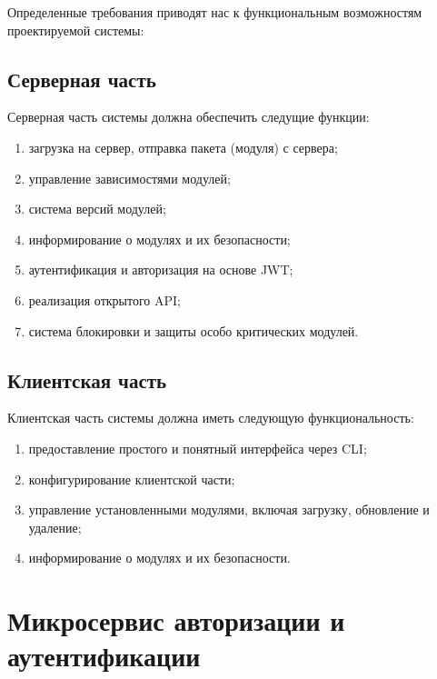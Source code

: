 Определенные требования приводят нас к функциональным возможностям проектируемой системы:

\subsection{Серверная часть}

Серверная часть системы должна обеспечить следущие функции:

\begin{enumerate}
    \item загрузка на сервер, отправка пакета (модуля) с сервера;
    \item управление зависимостями модулей;
    \item система версий модулей;
    \item информирование о модулях и их безопасности;
    \item аутентификация и авторизация на основе JWT;
    \item реализация открытого API;
    \item система блокировки и защиты особо критических модулей.
\end{enumerate}


\subsection{Клиентская часть}

Клиентская часть системы должна иметь следующую функциональность:

\begin{enumerate}
    \item предоставление простого и понятный интерфейса через CLI;
    \item конфигурирование клиентской части;
    \item управление установленными модулями, включая загрузку, обновление и удаление;
    \item информирование о модулях и их безопасности.
\end{enumerate}

\section{Микросервис авторизации и аутентификации}


